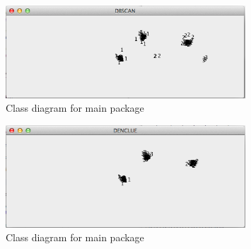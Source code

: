 \documentclass[12pt, a4paper, notitlepage, oneside]{article}
\begin{document}
\begin{figure}[!ht]
 	\centering
	\includegraphics[width=0.8\textwidth]{images/dbscan.png}
 	\caption[]
	{Class diagram for main package}
	\end{figure}

\begin{figure}[!ht]
 	\centering
	\includegraphics[width=0.8\textwidth]{images/denclue.png}
 	\caption[]
	{Class diagram for main package}
	\end{figure}







\end{document}
